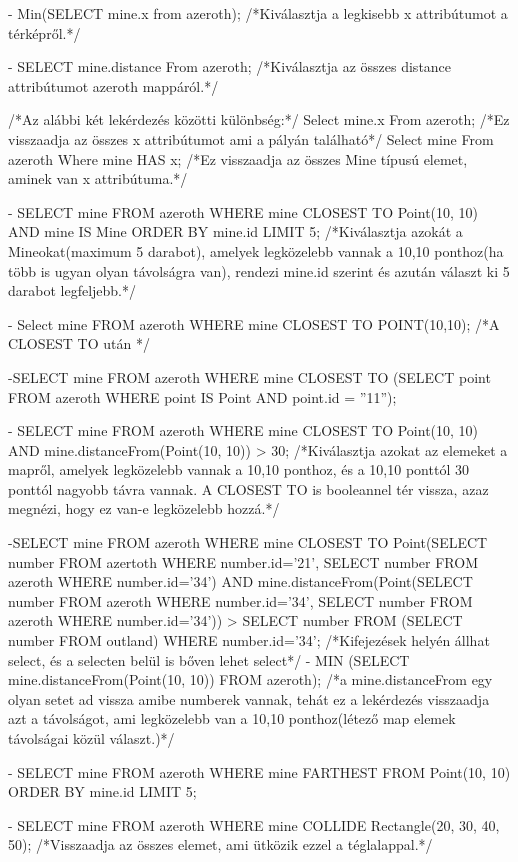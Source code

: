- Min(SELECT mine.x from azeroth);  /*Kiválasztja a legkisebb x attribútumot a térképről.*/

- SELECT mine.distance From azeroth;   /*Kiválasztja az összes distance attribútumot azeroth mappáról.*/

/*Az alábbi két lekérdezés közötti különbség:*/
Select mine.x From azeroth;  /*Ez visszaadja az összes x attribútumot ami a pályán található*/
Select mine From azeroth Where mine HAS x;  /*Ez visszaadja az összes Mine típusú elemet, aminek van x attribútuma.*/

- SELECT mine
FROM azeroth
WHERE mine CLOSEST TO Point(10, 10) AND mine IS Mine
ORDER BY mine.id
LIMIT 5;
/*Kiválasztja azokát a Mineokat(maximum 5 darabot), amelyek legközelebb vannak a 10,10 ponthoz(ha több is ugyan olyan távolságra van), 
rendezi mine.id szerint és azután választ ki 5 darabot legfeljebb.*/

- Select mine
FROM azeroth
WHERE mine CLOSEST TO POINT(10,10);
/*A CLOSEST TO után */

-SELECT mine
FROM azeroth
WHERE mine CLOSEST TO (SELECT point FROM azeroth WHERE point IS Point AND point.id = ”11”);

- SELECT mine
FROM azeroth
WHERE mine CLOSEST TO Point(10, 10) AND mine.distanceFrom(Point(10, 10)) > 30;
/*Kiválasztja azokat az elemeket a mapről, amelyek legközelebb vannak a 10,10 ponthoz, és a 10,10 ponttól 30 ponttól nagyobb távra vannak.
A CLOSEST TO is booleannel tér vissza, azaz megnézi, hogy ez van-e legközelebb hozzá.*/

-SELECT mine
FROM azeroth
WHERE mine CLOSEST TO Point(SELECT number FROM azertoth WHERE number.id='21', SELECT number FROM azeroth WHERE number.id='34')
 AND mine.distanceFrom(Point(SELECT number FROM azeroth WHERE number.id='34', SELECT number FROM azeroth WHERE number.id='34')) > SELECT number FROM (SELECT number FROM outland) WHERE number.id='34';
/*Kifejezések helyén állhat select, és a selecten belül is bőven lehet select*/
- MIN (SELECT mine.distanceFrom(Point(10, 10)) FROM azeroth);
/*a mine.distanceFrom egy olyan setet ad vissza amibe numberek vannak, tehát ez a lekérdezés visszaadja azt a távolságot, ami legközelebb van
a 10,10 ponthoz(létező map elemek távolságai közül választ.)*/

- SELECT mine
FROM azeroth
WHERE mine FARTHEST FROM Point(10, 10)
ORDER BY mine.id
LIMIT 5;

- SELECT mine
FROM azeroth
WHERE mine COLLIDE Rectangle(20, 30, 40, 50);
/*Visszaadja az összes elemet, ami ütközik ezzel a téglalappal.*/

